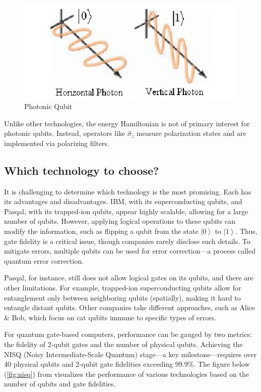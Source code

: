 \documentclass{article}
\begin{document}
\begin{multicols}{2}
\begin{figure}[H]
    \centering
    \includegraphics[width=\columnwidth]{fig/Single-photon-qubit.png}
    \caption{Photonic Qubit}
    \label{fig:Qubit_a_photons}
\end{figure}

Unlike other technologies, the energy Hamiltonian is not of primary interest for photonic qubits. Instead, operators like \( \hat{\sigma}_z \) measure polarization states and are implemented via polarizing filters.

\subsection{Which technology to choose?}

It is challenging to determine which technology is the most promising. Each has its advantages and disadvantages. IBM, with its superconducting qubits, and Pasqal, with its trapped-ion qubits, appear highly scalable, allowing for a large number of qubits. However, applying logical operations to these qubits can modify the information, such as flipping a qubit from the state \( \left|0\right> \) to \( \left|1\right> \). Thus, gate fidelity is a critical issue, though companies rarely disclose such details. To mitigate errors, multiple qubits can be used for error correction—a process called quantum error correction.

Pasqal, for instance, still does not allow logical gates on its qubits, and there are other limitations. For example, trapped-ion superconducting qubits allow for entanglement only between neighboring qubits (spatially), making it hard to entangle distant qubits. Other companies take different approaches, such as Alice & Bob, which focus on cat qubits immune to specific types of errors.

For quantum gate-based computers, performance can be gauged by two metrics: the fidelity of 2-qubit gates and the number of physical qubits. Achieving the NISQ (Noisy Intermediate-Scale Quantum) stage—a key milestone—requires over 40 physical qubits and 2-qubit gate fidelities exceeding 99.9\%. The figure below (\autoref{fig:nisq}) from \cite{ezratty_where_2023} visualizes the performance of various technologies based on the number of qubits and gate fidelities.


\end{multicols}
\end{document}
